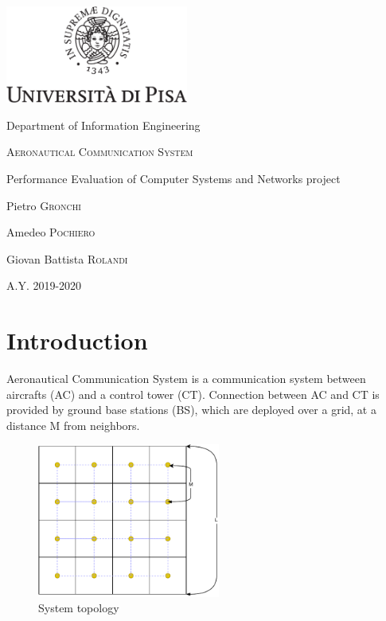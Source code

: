 \documentclass[a4paper,12pt]{article}
\newcommand{\projectname}{Aeronautical Communication System}
\begin{document}

{
  \begin{titlepage}
  	\centering
  	\includegraphics[width=6cm]{img/unipi.pdf}\par
    \vspace{1.5cm}
    {\Large Department of Information Engineering \par}
  	\vspace{1.5cm}
  	{\huge\textsc{\projectname{}}\par}
    \vspace{0.5cm}
    {\Large Performance Evaluation of Computer Systems and Networks project \par}
  	\vspace{2cm}
  	Pietro \textsc{Gronchi}\par
  	Amedeo \textsc{Pochiero}\par
    Giovan Battista \textsc{Rolandi}

  	\vfill

  	{\large A.Y. 2019-2020\par}
  \end{titlepage}
}


\clearpage
\tableofcontents
\clearpage
{}

\section{Introduction}
\projectname{} is a communication system between aircrafts (AC) and a control tower (CT).
Connection between AC and CT is provided by ground base stations (BS), which are deployed over a grid, at a distance M from neighbors.

\begin{figure}[H]
  \centering
  \includegraphics[width=6cm]{img/grid.pdf}
  \caption{System topology}
  \label{fig:grid}
\end{figure}
\end{document}
